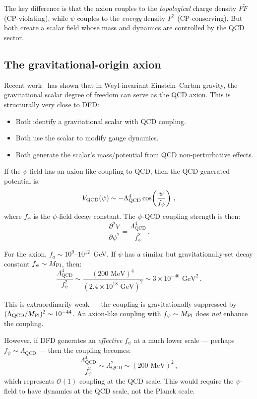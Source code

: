 \documentclass[aps,prd,twocolumn,superscriptaddress,floatfix,nofootinbib]{revtex4-2}
\renewcommand{\order}[1]{\mathcal{O}\!\left(#1\right)}
\newcommand{\LQCD}{\Lambda_{\mathrm{QCD}}}
\begin{document}
The key difference is that the axion couples to the \emph{topological} charge
density $F\tilde{F}$ (CP-violating), while $\psi$ couples to the \emph{energy}
density $F^2$ (CP-conserving). But both create a scalar field whose mass and
dynamics are controlled by the QCD sector.

\subsection{The gravitational-origin axion}

Recent work~\cite{GravAxion2025} has shown that in Weyl-invariant
Einstein--Cartan gravity, the gravitational scalar degree of freedom can serve as
the QCD axion. This is structurally very close to DFD:
\begin{itemize}
\item Both identify a gravitational scalar with QCD coupling.
\item Both use the scalar to modify gauge dynamics.
\item Both generate the scalar's mass/potential from QCD non-perturbative effects.
\end{itemize}

If the $\psi$-field has an axion-like coupling to QCD, then the QCD-generated
potential is:
\begin{equation}
V_{\rm QCD}(\psi) \sim -\LQCD^4 \cos\!\left(\frac{\psi}{f_\psi}\right) \, ,
\end{equation}
where $f_\psi$ is the $\psi$-field decay constant. The $\psi$-QCD coupling
strength is then:
\begin{equation}
\frac{\partial^2 V}{\partial\psi^2} = \frac{\LQCD^4}{f_\psi^2} \, .
\end{equation}

For the axion, $f_a \sim 10^{9}$--$10^{12}$~GeV. If $\psi$ has a similar but
gravitationally-set decay constant $f_\psi \sim M_{\rm Pl}$, then:
\begin{equation}
\frac{\LQCD^4}{f_\psi^2} \sim \frac{(200 \text{ MeV})^4}{(2.4 \times 10^{18}
\text{ GeV})^2} \sim 3 \times 10^{-46} \text{ GeV}^2 \, .
\end{equation}

This is extraordinarily weak --- the coupling is gravitationally suppressed by
$(\LQCD/M_{\rm Pl})^2 \sim 10^{-44}$. An axion-like coupling with $f_\psi \sim
M_{\rm Pl}$ does \emph{not} enhance the coupling.

However, if DFD generates an \emph{effective} $f_\psi$ at a much lower scale ---
perhaps $f_\psi \sim \LQCD$ --- then the coupling becomes:
\begin{equation}
\frac{\LQCD^4}{f_\psi^2} \sim \LQCD^2 \sim (200 \text{ MeV})^2 \, ,
\end{equation}
which represents $\order{1}$ coupling at the QCD scale. This would require the
$\psi$-field to have dynamics at the QCD scale, not the Planck scale.
\end{document}
